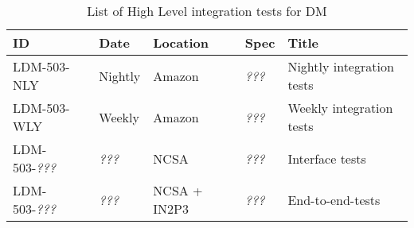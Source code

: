 \begin{longtable} {llllp{}}
\caption{List of High Level integration tests for DM \label{tab:schedule}} \\ %
\hline
\textbf{ID} & \textbf{Date} & \textbf{Location} & \textbf{Spec} & \textbf{Title} \\ \hline

LDM-503-NLY &
Nightly &
Amazon &
\textit{???} &
Nightly integration tests \\

LDM-503-WLY &
Weekly &
Amazon &
\textit{???}&
Weekly integration tests \\

LDM-503-\textit{???} &
\textit{???} &
NCSA &
\textit{???} &
Interface tests \\

LDM-503-\textit{???} &
\textit{???} &
NCSA + IN2P3 &
\textit{???} &
End-to-end-tests \\


\hline

\end{longtable}
